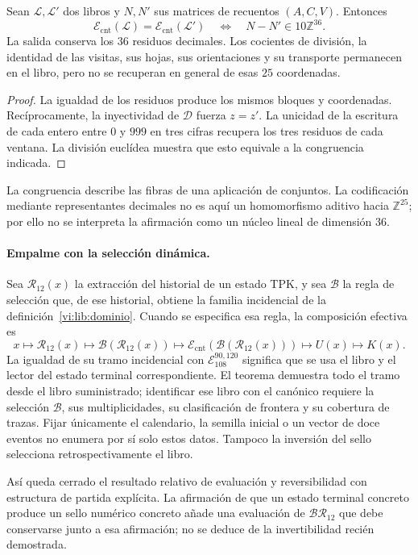 \begin{corollary}
\label{vi:lib:fibras}
Sean \(\mathscr L,\mathscr L'\) dos libros y \(N,N'\) sus
matrices de recuentos \((A,C,V)\). Entonces
\[
 \mathcal E_{\mathrm{cnt}}(\mathscr L)
   =\mathcal E_{\mathrm{cnt}}(\mathscr L')
 \quad\Longleftrightarrow\quad
 N-N'\in10\mathbb Z^{36}.
\]
La salida conserva los \(36\) residuos decimales. Los cocientes de
división, la identidad de las visitas, sus hojas, sus orientaciones y
su transporte permanecen en el libro, pero no se recuperan en general
de esas \(25\) coordenadas.
\end{corollary}
\begin{proof}
La igualdad de los residuos produce los mismos bloques y coordenadas.
Recíprocamente, la inyectividad de \(\mathcal D\) fuerza \(z=z'\).
La unicidad de la escritura de cada entero entre \(0\) y \(999\)
en tres cifras recupera los tres residuos de cada ventana. La división
euclídea muestra que esto equivale a la congruencia indicada.
\end{proof}

La congruencia describe las fibras de una aplicación de conjuntos.
La codificación mediante representantes decimales no es aquí un
homomorfismo aditivo hacia \(\mathbb Z^{25}\); por ello no se
interpreta la afirmación como un núcleo lineal de dimensión \(36\).

\paragraph{Empalme con la selección dinámica.}
Sea \(\mathcal R_{12}(x)\) la extracción del historial de un estado
TPK, y sea \(\mathcal B\) la regla de selección que, de ese historial,
obtiene la familia incidencial de la definición~\ref{vi:lib:dominio}.
Cuando se especifica esa regla, la composición efectiva es
\[
 x\longmapsto\mathcal R_{12}(x)
  \longmapsto\mathcal B(\mathcal R_{12}(x))
  \longmapsto\mathcal E_{\mathrm{cnt}}
       (\mathcal B(\mathcal R_{12}(x)))
  \longmapsto U(x)\longmapsto K(x).
\]
La igualdad de su tramo incidencial con
\(\mathcal E_{108}^{90,120}\) significa que se usa el libro y el
lector del estado terminal correspondiente. El teorema demuestra todo
el tramo desde el libro suministrado; identificar ese libro con el
canónico requiere la selección \(\mathcal B\), sus multiplicidades,
su clasificación de frontera y su cobertura de trazas. Fijar únicamente
el calendario, la semilla inicial o un vector de doce eventos no
enumera por sí solo estos datos. Tampoco la inversión del sello
selecciona retrospectivamente el libro.

Así queda cerrado el resultado relativo de evaluación y reversibilidad
con estructura de partida explícita. La afirmación de que un estado
terminal concreto produce un sello numérico concreto añade una
evaluación de \(\mathcal B\mathcal R_{12}\) que debe conservarse
junto a esa afirmación; no se deduce de la invertibilidad recién
demostrada.
